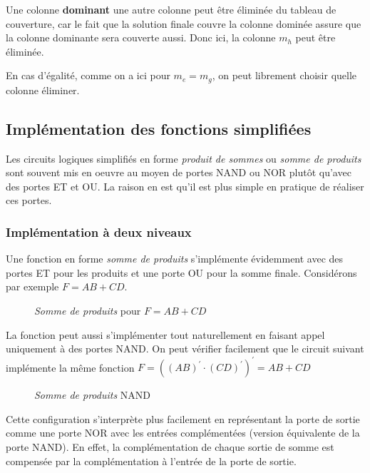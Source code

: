 \documentclass[11pt]{article}
\begin{document}
Une colonne \textbf{dominant} une autre colonne peut être éliminée du tableau de
couverture, car le fait que la solution finale couvre la colonne
dominée assure que la colonne dominante sera couverte aussi. Donc ici,
la colonne \(m_h\) peut être éliminée.

En cas d'égalité, comme on a ici pour \(m_e = m_g\), on peut librement
choisir quelle colonne éliminer.

\subsection{Implémentation des fonctions simplifiées}
\label{sec:orgaab6953}

Les circuits logiques simplifiés en forme \emph{produit de sommes} ou
\emph{somme de produits} sont souvent mis en oeuvre au moyen de portes NAND
ou NOR plutôt qu'avec des portes ET et OU. La raison en est qu'il est
plus simple en pratique de réaliser ces portes.

\subsubsection{Implémentation à deux niveaux}
\label{sec:org04f2b9b}

Une fonction en forme \emph{somme de produits} s'implémente évidemment avec
des portes ET pour les produits et une porte OU pour la somme
finale. Considérons par exemple \(F = AB + CD\).

\begin{figure}[htbp]
\centering

\caption{\label{fig:org2344df0}\emph{Somme de produits} pour \(F = AB + CD\)}
\end{figure} 

La fonction peut aussi s'implémenter tout naturellement en faisant
appel uniquement à des portes NAND. On peut vérifier facilement que le
circuit suivant implémente la même fonction \(F = ((AB)^\prime \cdot
(CD)^\prime)^\prime = AB + CD\)

\begin{figure}[htbp]
\centering

\caption{\label{fig:org2edd962}\emph{Somme de produits} NAND}
\end{figure} 

Cette configuration s'interprète plus facilement en représentant la
porte de sortie comme une porte NOR avec les entrées complémentées
(version équivalente de la porte NAND). En effet, la complémentation
de chaque sortie de somme est compensée par la complémentation à
l'entrée de la porte de sortie.
\end{document}
